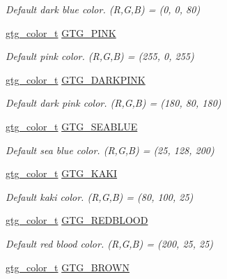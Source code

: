 \begin{DoxyCompactItemize}
\begin{DoxyCompactList}\small\item\em Default dark blue color. (R,G,B) = (0, 0, 80) \end{DoxyCompactList}\item 
\hyperlink{GTGColor_8h_a7d118edf2d6e2588a0323079259fb0d6}{gtg\-\_\-color\-\_\-t} \hyperlink{group__GTGColor_ga190c0283ea923a8985673bf855acb0f1}{G\-T\-G\-\_\-\-P\-I\-N\-K}
\begin{DoxyCompactList}\small\item\em Default pink color. (R,G,B) = (255, 0, 255) \end{DoxyCompactList}\item 
\hyperlink{GTGColor_8h_a7d118edf2d6e2588a0323079259fb0d6}{gtg\-\_\-color\-\_\-t} \hyperlink{group__GTGColor_gaa08fc4857b39b8de719eb2856b040ebe}{G\-T\-G\-\_\-\-D\-A\-R\-K\-P\-I\-N\-K}
\begin{DoxyCompactList}\small\item\em Default dark pink color. (R,G,B) = (180, 80, 180) \end{DoxyCompactList}\item 
\hyperlink{GTGColor_8h_a7d118edf2d6e2588a0323079259fb0d6}{gtg\-\_\-color\-\_\-t} \hyperlink{group__GTGColor_ga64753688aed5f6684f07f8e0878f312e}{G\-T\-G\-\_\-\-S\-E\-A\-B\-L\-U\-E}
\begin{DoxyCompactList}\small\item\em Default sea blue color. (R,G,B) = (25, 128, 200) \end{DoxyCompactList}\item 
\hyperlink{GTGColor_8h_a7d118edf2d6e2588a0323079259fb0d6}{gtg\-\_\-color\-\_\-t} \hyperlink{group__GTGColor_ga39b7ac86d036b3eeffb481bb8c7a0404}{G\-T\-G\-\_\-\-K\-A\-K\-I}
\begin{DoxyCompactList}\small\item\em Default kaki color. (R,G,B) = (80, 100, 25) \end{DoxyCompactList}\item 
\hyperlink{GTGColor_8h_a7d118edf2d6e2588a0323079259fb0d6}{gtg\-\_\-color\-\_\-t} \hyperlink{group__GTGColor_gabbc9bfb94e29f9403a7e139e4f4bf87a}{G\-T\-G\-\_\-\-R\-E\-D\-B\-L\-O\-O\-D}
\begin{DoxyCompactList}\small\item\em Default red blood color. (R,G,B) = (200, 25, 25) \end{DoxyCompactList}\item 
\hyperlink{GTGColor_8h_a7d118edf2d6e2588a0323079259fb0d6}{gtg\-\_\-color\-\_\-t} \hyperlink{group__GTGColor_gadce47970948c2b8fed1561b4ad48a77d}{G\-T\-G\-\_\-\-B\-R\-O\-W\-N}

\end{DoxyCompactItemize}
